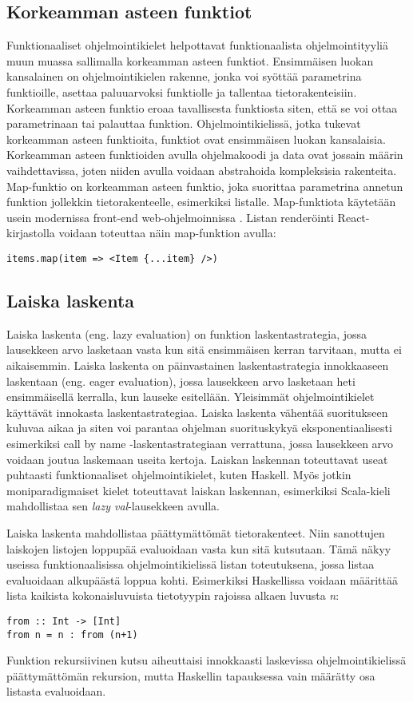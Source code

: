 \subsection{Korkeamman asteen funktiot}
Funktionaaliset ohjelmointikielet helpottavat funktionaalista ohjelmointityyliä muun muassa sallimalla korkeamman asteen
funktiot. Ensimmäisen luokan kansalainen on ohjelmointikielen rakenne, jonka voi syöttää parametrina funktioille,
asettaa paluuarvoksi funktiolle ja tallentaa tietorakenteisiin. Korkeamman asteen funktio eroaa tavallisesta funktiosta
siten, että se voi ottaa parametrinaan tai palauttaa funktion. Ohjelmointikielissä, jotka tukevat korkeamman asteen
funktioita, funktiot ovat ensimmäisen luokan kansalaisia. Korkeamman asteen funktioiden avulla ohjelmakoodi ja data ovat
jossain määrin vaihdettavissa, joten niiden avulla voidaan abstrahoida kompleksisia rakenteita. \cite{hudak} Map-funktio
on korkeamman asteen funktio, joka suorittaa parametrina annetun funktion jollekkin tietorakenteelle, esimerkiksi
listalle. Map-funktiota käytetään usein modernissa front-end web-ohjelmoinnissa \cite{functionalreact}. Listan
renderöinti React-kirjastolla voidaan toteuttaa näin map-funktion avulla:
\begin{verbatim}
items.map(item => <Item {...item} />)
\end{verbatim}

\subsection{Laiska laskenta}
Laiska laskenta (eng. lazy evaluation) on funktion laskentastrategia, jossa lausekkeen arvo lasketaan vasta kun sitä
ensimmäisen kerran tarvitaan, mutta ei aikaisemmin. Laiska laskenta on päinvastainen laskentastrategia innokkaaseen
laskentaan (eng. eager evaluation), jossa lausekkeen arvo lasketaan heti ensimmäisellä kerralla, kun lauseke esitellään.
Yleisimmät ohjelmointikielet käyttävät innokasta laskentastrategiaa. Laiska laskenta vähentää suoritukseen kuluvaa aikaa
ja siten voi parantaa ohjelman suorituskykyä eksponentiaalisesti esimerkiksi call by name -laskentastrategiaan
verrattuna, jossa lausekkeen arvo voidaan joutua laskemaan useita kertoja. Laiskan laskennan toteuttavat useat puhtaasti
funktionaaliset ohjelmointikielet, kuten Haskell. Myös jotkin moniparadigmaiset kielet toteuttavat laiskan laskennan,
esimerkiksi Scala-kieli mahdollistaa sen \textit{lazy val}-lausekkeen avulla. \cite{languagedesign}

Laiska laskenta mahdollistaa päättymättömät tietorakenteet. Niin sanottujen laiskojen listojen loppupää evaluoidaan
vasta kun sitä kutsutaan. Tämä näkyy useissa funktionaalisissa ohjelmointikielissä listan toteutuksena, jossa listaa
evaluoidaan alkupäästä loppua kohti. Esimerkiksi Haskellissa voidaan määrittää lista kaikista kokonaisluvuista
tietotyypin rajoissa alkaen luvusta \textit{n}:
\begin{verbatim}
from :: Int -> [Int]
from n = n : from (n+1)
\end{verbatim}
Funktion rekursiivinen kutsu aiheuttaisi innokkaasti laskevissa ohjelmointikielissä päättymättömän rekursion, mutta
Haskellin tapauksessa vain määrätty osa listasta evaluoidaan. \cite{languagedesign}

